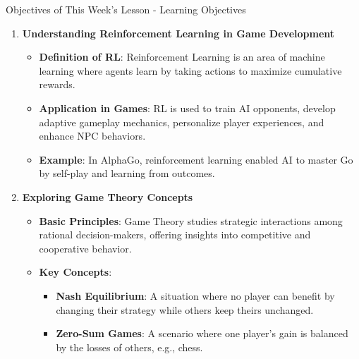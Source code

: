\documentclass[aspectratio=169]{beamer}
\begin{document}
\begin{frame}[fragile]{Objectives of This Week's Lesson - Learning Objectives}
    \begin{enumerate}
        \item \textbf{Understanding Reinforcement Learning in Game Development}
            \begin{itemize}
                \item \textbf{Definition of RL}: Reinforcement Learning is an area of machine learning where agents learn by taking actions to maximize cumulative rewards.
                \item \textbf{Application in Games}: RL is used to train AI opponents, develop adaptive gameplay mechanics, personalize player experiences, and enhance NPC behaviors.
                \item \textbf{Example}: In AlphaGo, reinforcement learning enabled AI to master Go by self-play and learning from outcomes.
            \end{itemize}
            
        \item \textbf{Exploring Game Theory Concepts}
            \begin{itemize}
                \item \textbf{Basic Principles}: Game Theory studies strategic interactions among rational decision-makers, offering insights into competitive and cooperative behavior.
                \item \textbf{Key Concepts}:
                    \begin{itemize}
                        \item \textbf{Nash Equilibrium}: A situation where no player can benefit by changing their strategy while others keep theirs unchanged.
                        \item \textbf{Zero-Sum Games}: A scenario where one player's gain is balanced by the losses of others, e.g., chess.
                    \end{itemize}
            \end{itemize}
    \end{enumerate}
\end{frame}
\end{document}
